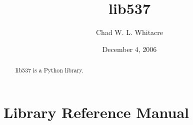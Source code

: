 \documentclass{manual}
\title{lib537}
\author{Chad W. L. Whitacre}
\date{December 4, 2006} %
\begin{document}
\maketitle

\begin{abstract}

\noindent
lib537 is a Python library.

\end{abstract}



\chapter{Library Reference Manual}
\label{manual}






\end{document}
